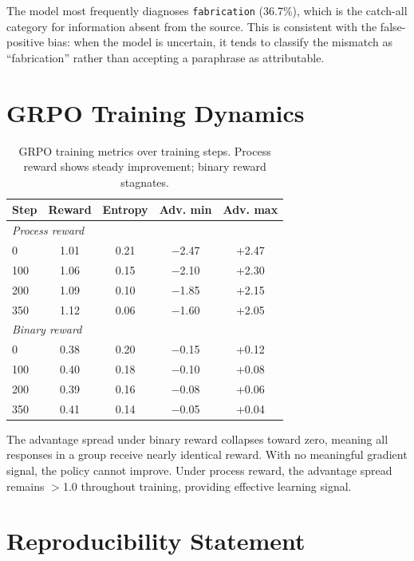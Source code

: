 \documentclass[11pt]{article}
\begin{document}
The model most frequently diagnoses \texttt{fabrication} (36.7\%), which is the catch-all category for information absent from the source.
This is consistent with the false-positive bias: when the model is uncertain, it tends to classify the mismatch as ``fabrication'' rather than accepting a paraphrase as attributable.


\section{GRPO Training Dynamics}
\label{app:dynamics}

\begin{table}[h]
\centering
\small
\caption{GRPO training metrics over training steps. Process reward shows steady improvement; binary reward stagnates.}
\label{tab:dynamics}
\begin{tabular}{lcccc}
\toprule
\textbf{Step} & \textbf{Reward} & \textbf{Entropy} & \textbf{Adv. min} & \textbf{Adv. max} \\
\midrule
\multicolumn{5}{l}{\textit{Process reward}} \\
0 & 1.01 & 0.21 & $-$2.47 & +2.47 \\
100 & 1.06 & 0.15 & $-$2.10 & +2.30 \\
200 & 1.09 & 0.10 & $-$1.85 & +2.15 \\
350 & 1.12 & 0.06 & $-$1.60 & +2.05 \\
\midrule
\multicolumn{5}{l}{\textit{Binary reward}} \\
0 & 0.38 & 0.20 & $-$0.15 & +0.12 \\
100 & 0.40 & 0.18 & $-$0.10 & +0.08 \\
200 & 0.39 & 0.16 & $-$0.08 & +0.06 \\
350 & 0.41 & 0.14 & $-$0.05 & +0.04 \\
\bottomrule
\end{tabular}
\end{table}

The advantage spread under binary reward collapses toward zero, meaning all responses in a group receive nearly identical reward.
With no meaningful gradient signal, the policy cannot improve.
Under process reward, the advantage spread remains $>$1.0 throughout training, providing effective learning signal.


\section*{Reproducibility Statement}
\end{document}

